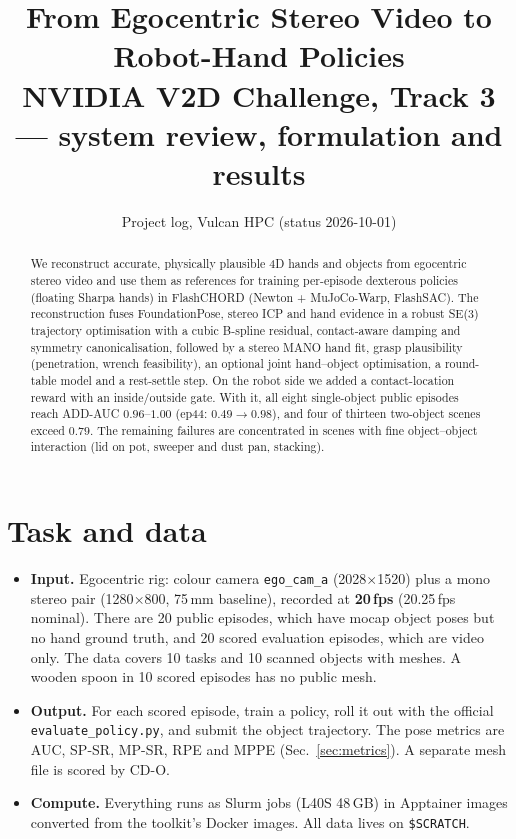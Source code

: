 \documentclass[10pt,a4paper]{article}
\title{\textbf{From Egocentric Stereo Video to Robot-Hand Policies}\\[2pt]
\large NVIDIA V2D Challenge, Track 3 --- system review, formulation and results}
\author{Project log, Vulcan HPC (status 2026-10-01)}
\date{}
\begin{document}
\maketitle

\begin{abstract}
We reconstruct accurate, physically plausible 4D hands and objects from egocentric stereo video and use
them as references for training per-episode dexterous policies (floating Sharpa hands) in FlashCHORD
(Newton + MuJoCo-Warp, FlashSAC). The reconstruction fuses FoundationPose, stereo ICP and hand
evidence in a robust SE(3) trajectory optimisation with a cubic B-spline residual, contact-aware damping
and symmetry canonicalisation, followed by a stereo MANO hand fit, grasp plausibility (penetration, wrench
feasibility), an optional joint hand--object optimisation, a round-table model and a rest-settle step.
On the robot side we added a contact-location reward with an inside/outside gate. With it, all
eight single-object public episodes reach ADD-AUC $0.96$--$1.00$ (ep44: $0.49\to0.98$), and four of thirteen
two-object scenes exceed $0.79$. The remaining failures are concentrated in scenes with fine
object--object interaction (lid on pot, sweeper and dust pan, stacking).
\end{abstract}

\tableofcontents
\bigskip

\section{Task and data}
\begin{itemize}
\item \textbf{Input.} Egocentric rig: colour camera \texttt{ego\_cam\_a} (2028$\times$1520) plus a mono stereo pair
(1280$\times$800, 75\,mm baseline), recorded at \textbf{20\,fps} (20.25\,fps nominal). There are 20 public episodes, which have
mocap object poses but no hand ground truth, and 20 scored evaluation episodes, which are video only. The data covers
10 tasks and 10 scanned objects with meshes. A wooden spoon in 10 scored episodes has no public mesh.
\item \textbf{Output.} For each scored episode, train a policy, roll it out with the official
\texttt{evaluate\_policy.py}, and submit the object trajectory. The pose metrics are AUC, SP-SR, MP-SR, RPE and MPPE (Sec.~\ref{sec:metrics}).
A separate mesh file is scored by CD-O.
\item \textbf{Compute.} Everything runs as Slurm jobs (L40S 48\,GB) in Apptainer images converted from the
toolkit's Docker images. All data lives on \texttt{\$SCRATCH}.
\end{itemize}
\end{document}
